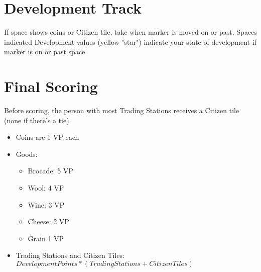 \documentclass[8pt]{article}
\newenvironment{itemizeCustom}
{\begin{itemize}
  \setlength{\itemsep}{1pt}
  \setlength{\parskip}{0pt}
  \setlength{\parsep}{0pt}}
{\end{itemize}}
\begin{document}
\begin{multicols*}{2}
\section*{Development Track}
If space shows coins or Citizen tile, take when marker is moved on or past. Spaces indicated Development values (yellow "star") indicate your state of development if marker is on or past space.

\section*{Final Scoring}
Before scoring, the person with most Trading Stations receives a Citizen tile (none if there's a tie).
\begin{itemizeCustom}
    \item Coins are 1 VP each
    \item Goods:
        \begin{itemizeCustom}
            \item Brocade: 5 VP
            \item Wool: 4 VP
            \item Wine: 3 VP
            \item Cheese: 2 VP
            \item Grain 1 VP
        \end{itemizeCustom}
    \item Trading Stations and Citizen Tiles: \(Development Points * (Trading Stations + Citizen Tiles)\)
\end{itemizeCustom}

\end{multicols*}
\end{document}
